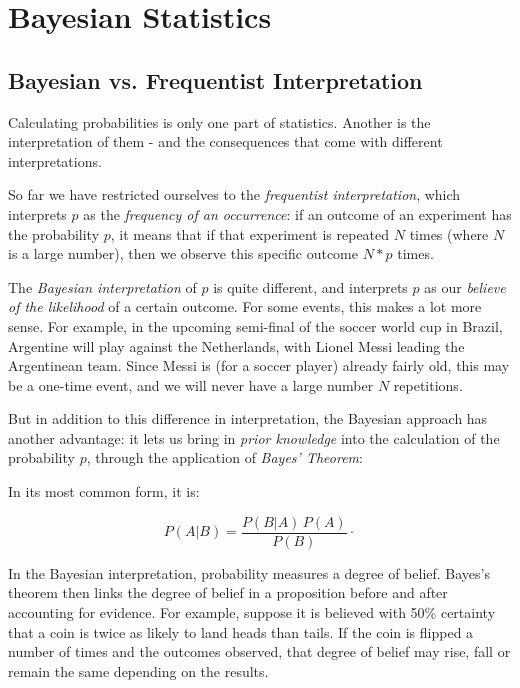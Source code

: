 \chapter{Bayesian Statistics}\label{chapter:Bayes}

\section{Bayesian vs. Frequentist Interpretation}

Calculating probabilities is only one part of statistics. Another is the interpretation of them - and the consequences that come with different interpretations.

So far we have restricted ourselves to the \emph{frequentist interpretation}, which interprets $p$ as the \emph{frequency of an occurrence}: if an outcome of an experiment has the probability $p$, it means that if that experiment is repeated $N$ times (where $N$ is a large number), then we observe this specific outcome $N*p$ times.

The \emph{Bayesian interpretation} of $p$ is quite different, and interprets $p$ as our \emph{believe of the likelihood} of a certain outcome. For some events, this makes a lot more sense. For example, in the upcoming semi-final of the soccer world cup in Brazil, Argentine will play against the Netherlands, with Lionel Messi leading the Argentinean team. Since Messi is (for a soccer player) already fairly old, this may be a one-time event, and we will never have a large number $N$ repetitions.

But in addition to this difference in interpretation, the Bayesian approach has another advantage: it lets us bring in \emph{prior knowledge} into the calculation of the probability $p$, through the application of \emph{Bayes' Theorem}:

In its most common form, it is:

\begin{equation}\label{eq:BayesTheorem}
  P(A|B) = \frac{P(B | A)\, P(A)}{P(B)}\cdot
\end{equation}

In the Bayesian interpretation, probability measures a degree of belief. Bayes's theorem then links the degree of belief in a proposition before and after accounting for evidence. For example, suppose it is believed with 50\% certainty that a coin is twice as likely to land heads than tails. If the coin is flipped a number of times and the outcomes observed, that degree of belief may rise, fall or remain the same depending on the results.

